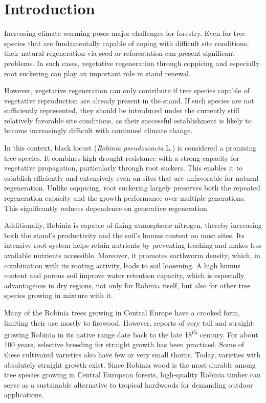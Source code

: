 \section{Introduction}

Increasing climate warming poses major challenges for forestry. Even for tree species that are fundamentally capable of coping with difficult site conditions, their natural regeneration via seed or reforestation can present significant problems. In such cases, vegetative regeneration through coppicing and especially root suckering can play an important role in stand renewal.

However, vegetative regeneration can only contribute if tree species capable of vegetative reproduction are already present in the stand. If such species are not sufficiently represented, they should be introduced under the currently still relatively favorable site conditions, as their successful establishment is likely to become increasingly difficult with continued climate change.

In this context, black locust (\emph{Robinia pseudoacacia} L.) is considered a promising tree species. It combines high drought resistance with a strong capacity for vegetative propagation, particularly through root suckers. This enables it to establish efficiently and extensively even on sites that are unfavorable for natural regeneration. Unlike coppicing, root suckering largely preserves both the repeated regeneration capacity and the growth performance over multiple generations. This significantly reduces dependence on generative regeneration.

Additionally, Robinia is capable of fixing atmospheric nitrogen, thereby increasing both the stand’s productivity and the soil’s humus content on most sites. Its intensive root system helps retain nutrients by preventing leaching and makes less available nutrients accessible. Moreover, it promotes earthworm density, which, in combination with its rooting activity, leads to soil loosening. A high humus content and porous soil improve water retention capacity, which is especially advantageous in dry regions, not only for Robinia itself, but also for other tree species growing in mixture with it.

Many of the Robinia trees growing in Central Europe have a crooked form, limiting their use mostly to firewood. However, reports of very tall and straight-growing Robinia in its native range date back to the late 18\textsuperscript{th} century. For about 100 years, selective breeding for straight growth has been practiced. Some of these cultivated varieties also have few or very small thorns. Today, varieties with absolutely straight growth exist. Since Robinia wood is the most durable among tree species growing in Central European forests, high-quality Robinia timber can serve as a sustainable alternative to tropical hardwoods for demanding outdoor applications.


